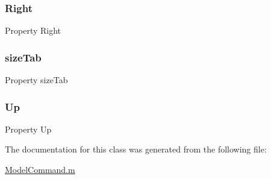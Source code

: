 \subsubsection{\texorpdfstring{Right}{Right}}
{\footnotesize\ttfamily Property Right}

\mbox{\label{class_model_command_ae640bc88fc010e791bc24036ce976b37}} 
\subsubsection{\texorpdfstring{size\+Tab}{sizeTab}}
{\footnotesize\ttfamily Property size\+Tab}

\mbox{\label{class_model_command_a49ef9f9d2c8a6ee7c27e9394fd77cf71}} 
\subsubsection{\texorpdfstring{Up}{Up}}
{\footnotesize\ttfamily Property Up}



The documentation for this class was generated from the following file\+:\begin{DoxyCompactItemize}
\item 
\hyperlink{_model_command_8m}{Model\+Command.\+m}\end{DoxyCompactItemize}
